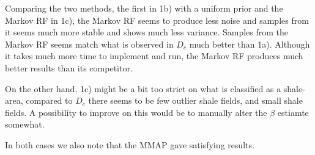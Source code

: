 \documentclass[]{article}
\begin{document}
Comparing the two methods, the first in 1b) with a uniform prior and the
Markov RF in 1c), the Markov RF seems to produce less noise and samples
from it seems much more stable and shows much less variance. Samples
from the Markov RF seems match what is observed in \(D_c\) much better
than 1a). Although it takes much more time to implement and run, the
Markov RF produces much better results than its competitor.

On the other hand, 1c) might be a bit too strict on what is classified
as a shale-area, compared to \(D_c\) there seems to be few outlier shale
fields, and small shale fields. A possibility to improve on this would
be to manually alter the \(\beta\) estiamte somewhat.

In both cases we also note that the MMAP gave satisfying results.
\end{document}
